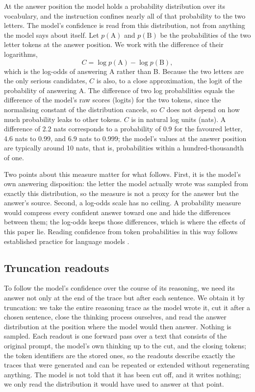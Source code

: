 \documentclass[11pt]{article}
\begin{document}
At the answer position the model holds a probability distribution over its vocabulary, and the instruction confines nearly all of that probability to the two letters. The model's confidence is read from this distribution, not from anything the model says about itself. Let $p(\mathrm{A})$ and $p(\mathrm{B})$ be the probabilities of the two letter tokens at the answer position. We work with the difference of their logarithms,
\[
C = \log p(\mathrm{A}) - \log p(\mathrm{B}),
\]
which is the log-odds of answering A rather than B. Because the two letters are the only serious candidates, $C$ is also, to a close approximation, the logit of the probability of answering A. The difference of two log probabilities equals the difference of the model's raw scores (logits) for the two tokens, since the normalising constant of the distribution cancels, so $C$ does not depend on how much probability leaks to other tokens. $C$ is in natural log units (nats). A difference of 2.2 nats corresponds to a probability of 0.9 for the favoured letter, 4.6 nats to 0.99, and 6.9 nats to 0.999; the model's values at the answer position are typically around 10 nats, that is, probabilities within a hundred-thousandth of one.

Two points about this measure matter for what follows. First, it is the model's own answering disposition: the letter the model actually wrote was sampled from exactly this distribution, so the measure is not a proxy for the answer but the answer's source. Second, a log-odds scale has no ceiling. A probability measure would compress every confident answer toward one and hide the differences between them; the log-odds keeps those differences, which is where the effects of this paper lie. Reading confidence from token probabilities in this way follows established practice for language models \citep{kadavath2022language}.

\subsection{Truncation readouts}
\label{sec:truncation}

To follow the model's confidence over the course of its reasoning, we need its answer not only at the end of the trace but after each sentence. We obtain it by truncation: we take the entire reasoning trace as the model wrote it, cut it after a chosen sentence, close the thinking process ourselves, and read the answer distribution at the position where the model would then answer. Nothing is sampled. Each readout is one forward pass over a text that consists of the original prompt, the model's own thinking up to the cut, and the closing tokens; the token identifiers are the stored ones, so the readouts describe exactly the traces that were generated and can be repeated or extended without regenerating anything. The model is not told that it has been cut off, and it writes nothing; we only read the distribution it would have used to answer at that point.
\end{document}
